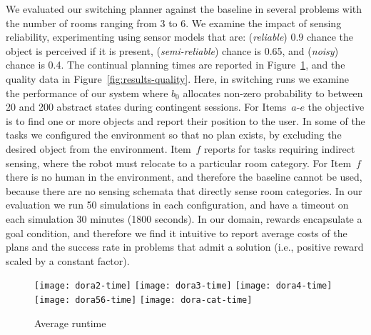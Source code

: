
We evaluated our switching planner against the baseline in several
problems with the number of rooms ranging from 3 to 6. We examine the
impact of sensing reliability, experimenting using sensor models that
are: ({\em reliable}) $0.9$ chance the object is perceived if it is
present, ({\em semi-reliable}) chance is 0.65, and ({\em noisy})
chance is 0.4. The continual planning times are reported in
Figure~\ref{fig:results-time}, and the quality data in
Figure~\ref{fig:results-quality}. Here, in switching runs we examine
the performance of our system where $b_0$ allocates non-zero
probability to between 20 and 200 abstract states during contingent
sessions. For Items~$a$-$e$ the objective is to find one or more
objects and report their position to the user. In some of the tasks we
configured the environment so that no plan exists, by excluding the
desired object from the environment. Item~$f$ reports for tasks
requiring indirect sensing, where the robot must relocate to a
particular room category. For Item~$f$ there is no human in the
environment, and therefore the baseline cannot be used, because there
are no sensing schemata that directly sense room categories. In our
evaluation we run 50 simulations in each configuration, and have a
timeout on each simulation 30 minutes (1800 seconds). In our domain,
rewards encapsulate a goal condition, and therefore we find it
intuitive to report average costs of the plans and the success rate in
problems that admit a solution (i.e., positive reward scaled by a
constant factor).



\begin{figure}[h!]
  \texttt{[image: dora2-time]}\hfill
  \texttt{[image: dora3-time]}\hfill
  \texttt{[image: dora4-time]}\hfill
  \vspace{2mm}
  \texttt{[image: dora56-time]}\hfill
  \vspace{2mm}
  \texttt{[image: dora-cat-time]}\hfill
  \caption{Average runtime}
  \label{fig:results-time}
\end{figure}

